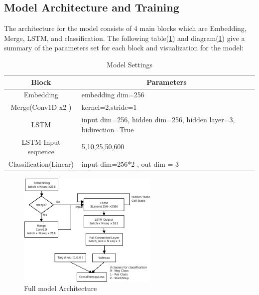 \documentclass[12pt]{article}
\begin{document}
\subsection{Model Architecture and Training}\label{modelarch}
The architecture for the model consists of 4 main blocks which are Embedding, Merge, LSTM, and classification. The following table(\ref{tab:modelsettings}) and diagram(\ref{fig:modelArch}) give a summary of the parameters set for each block and visualization for the model:
\begin{table}[!h]
\begin{tabular}{|c|l|}
\hline
Block                   & \multicolumn{1}{c|}{Parameters}                                 \\ \hline
Embedding               & embedding dim=256                                               \\ \hline
Merge(Conv1D x2 )       & kernel=2,stride=1                                               \\ \hline
LSTM                    & input dim=256, hidden dim=256, hidden layer=3, bidirection=True \\ \hline
LSTM Input sequence          & 5,10,25,50,600                                                  \\ \hline
Classification(Linear) & input dim=256*2 , out dim = 3                                   \\ \hline
\end{tabular}
\caption{Model Settings}
\label{tab:modelsettings}
\end{table}
\newpage
\begin{figure} [!h]
\begin{center}
\includegraphics[width=0.6\textwidth]{figures/modelDiagram.png}
\caption{Full model Architecture}
\label{fig:modelArch}
\end{center}
\end{figure}
\end{document}
